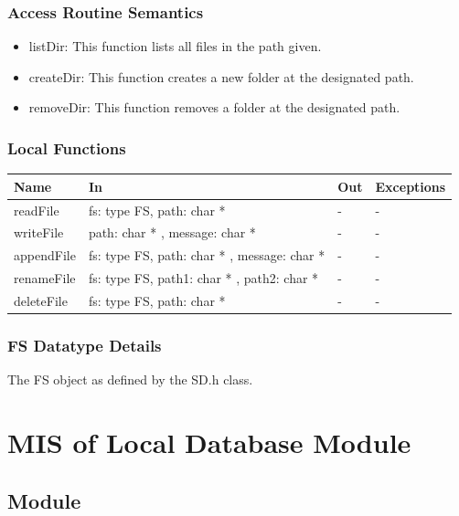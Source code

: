 \documentclass[12pt, titlepage]{article}
\begin{document}
\subsubsection{Access Routine Semantics}

\begin{itemize}
\item listDir: This function lists all files in the path given.
\item createDir: This function creates a new folder at the designated path.
\item removeDir: This function removes a folder at the designated path.
\end{itemize}

\subsubsection{Local Functions}

\begin{center}
\begin{tabular}{p{2cm} p{4cm} p{3.5cm} p{4cm}}
\hline
\textbf{Name} & \textbf{In} & \textbf{Out} & \textbf{Exceptions} \\
\hline
readFile & fs: type FS, path: char * & - & - \\
writeFile & path: char * , message: char *& - & - \\
appendFile & fs: type FS, path: char * , message: char * & - & - \\
renameFile & fs: type FS, path1: char * , path2: char * & - & -\\
deleteFile & fs: type FS, path: char * & - & - \\
\hline
\end{tabular}
\end{center}

\subsubsection{FS Datatype Details}
The FS object as defined by the SD.h class.

\newpage

\section{MIS of Local Database Module} \label{mDS_2} 

\subsection{Module}
\end{document}
